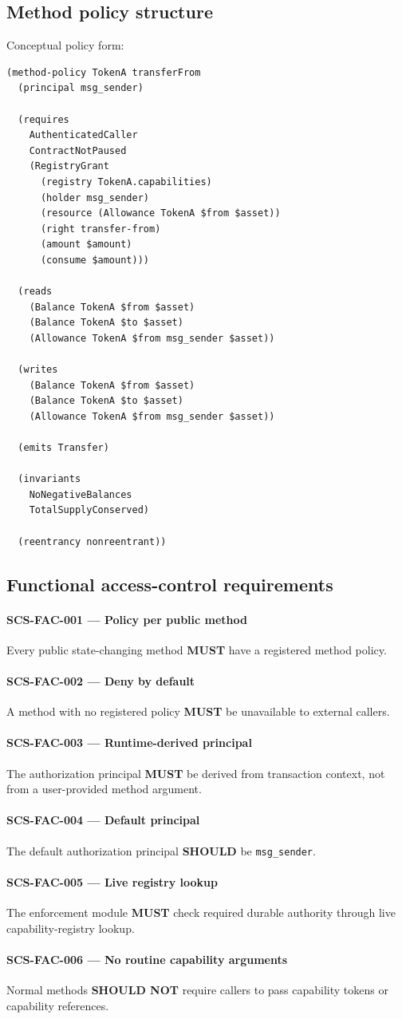 \documentclass[11pt]{article}
\newcommand{\MUST}{\textbf{MUST}}
\newcommand{\SHOULD}{\textbf{SHOULD}}
\newcommand{\SHOULDNOT}{\textbf{SHOULD NOT}}
\newcommand{\req}[2]{\paragraph{#1}#2\par}
\newcommand{\code}[1]{\texttt{#1}}
\begin{document}
\subsection{Method policy structure}

Conceptual policy form:

\begin{lstlisting}
(method-policy TokenA transferFrom
  (principal msg_sender)

  (requires
    AuthenticatedCaller
    ContractNotPaused
    (RegistryGrant
      (registry TokenA.capabilities)
      (holder msg_sender)
      (resource (Allowance TokenA $from $asset))
      (right transfer-from)
      (amount $amount)
      (consume $amount)))

  (reads
    (Balance TokenA $from $asset)
    (Balance TokenA $to $asset)
    (Allowance TokenA $from msg_sender $asset))

  (writes
    (Balance TokenA $from $asset)
    (Balance TokenA $to $asset)
    (Allowance TokenA $from msg_sender $asset))

  (emits Transfer)

  (invariants
    NoNegativeBalances
    TotalSupplyConserved)

  (reentrancy nonreentrant))
\end{lstlisting}

\subsection{Functional access-control requirements}

\req{SCS-FAC-001 --- Policy per public method}{Every public state-changing method \MUST{} have a registered method policy.}

\req{SCS-FAC-002 --- Deny by default}{A method with no registered policy \MUST{} be unavailable to external callers.}

\req{SCS-FAC-003 --- Runtime-derived principal}{The authorization principal \MUST{} be derived from transaction context, not from a user-provided method argument.}

\req{SCS-FAC-004 --- Default principal}{The default authorization principal \SHOULD{} be \code{msg\_sender}.}

\req{SCS-FAC-005 --- Live registry lookup}{The enforcement module \MUST{} check required durable authority through live capability-registry lookup.}

\req{SCS-FAC-006 --- No routine capability arguments}{Normal methods \SHOULDNOT{} require callers to pass capability tokens or capability references.}
\end{document}
